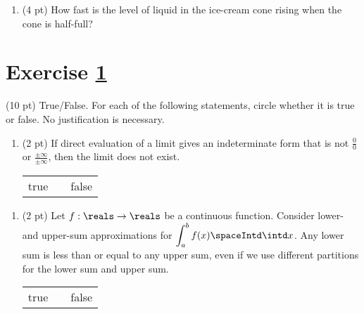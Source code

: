 \begin{enumerate}[resume,label=(\alph*)]
\item\label{itm : P1Q4b} (4 pt) How fast is the level of liquid in the ice-cream cone rising when the cone is half-full? 
\end{enumerate}

\spaceSolution{2.5in}{%
}%





%
%

\newpage





%
%
%
%


\section{Exercise \ref{sec : Math112 Spring2022 FinalExam P2Q1}}
\label{sec : Math112 Spring2022 FinalExam P2Q1}

(10 pt) True/False. For each of the following statements, circle whether it is true or false. No justification is necessary.

\begin{enumerate}[label=(\alph*)]
\item\label{itm : Exam4P2Q1a} (2 pt) If direct evaluation of a limit gives an indeterminate form that is not $\frac{0}{0}$ or $\frac{\pm{}\infty}{\pm{}\infty}$, then the limit does not exist.
\begin{center}
\begin{tabular}{c c c}
true	&	\hspace{1in}	&	false
\end{tabular}
\end{center}
\end{enumerate}




\begin{enumerate}[resume,label=(\alph*)]
\item\label{itm : Exam4P2Q1b} (2 pt) Let $f : \reals \rightarrow \reals$ be a continuous function. Consider lower- and upper-sum approximations for $\displaystyle\int_{a}^{b} f(x) \spaceIntd \intd x$. Any lower sum is less than or equal to any upper sum, even if we use different partitions for the lower sum and upper sum.
\begin{center}
\begin{tabular}{c c c}
true	&	\hspace{1in}	&	false
\end{tabular}
\end{center}
\end{enumerate}

